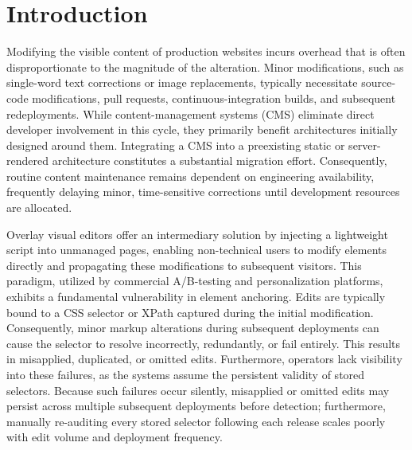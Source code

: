 \documentclass[conference]{IEEEtran}
\begin{document}
\vspace{4pt}
\vspace{6pt}

\section{Introduction}
Modifying the visible content of production websites incurs overhead that is often disproportionate to the magnitude of the alteration. Minor modifications, such as single-word text corrections or image replacements, typically necessitate source-code modifications, pull requests, continuous-integration builds, and subsequent redeployments. While content-management systems (CMS) eliminate direct developer involvement in this cycle, they primarily benefit architectures initially designed around them. Integrating a CMS into a preexisting static or server-rendered architecture constitutes a substantial migration effort. Consequently, routine content maintenance remains dependent on engineering availability, frequently delaying minor, time-sensitive corrections until development resources are allocated.

Overlay visual editors offer an intermediary solution by injecting a lightweight script into unmanaged pages, enabling non-technical users to modify elements directly and propagating these modifications to subsequent visitors. This paradigm, utilized by commercial A/B-testing and personalization platforms, exhibits a fundamental vulnerability in element anchoring. Edits are typically bound to a CSS selector or XPath captured during the initial modification. Consequently, minor markup alterations during subsequent deployments can cause the selector to resolve incorrectly, redundantly, or fail entirely. This results in misapplied, duplicated, or omitted edits. Furthermore, operators lack visibility into these failures, as the systems assume the persistent validity of stored selectors. Because such failures occur silently, misapplied or omitted edits may persist across multiple subsequent deployments before detection; furthermore, manually re-auditing every stored selector following each release scales poorly with edit volume and deployment frequency.
\end{document}
